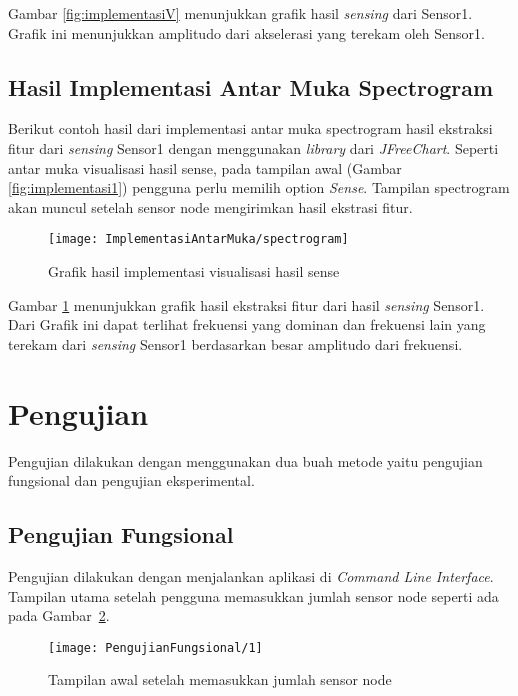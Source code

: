Gambar \ref{fig:implementasiV} menunjukkan grafik hasil {\it sensing} dari Sensor1. Grafik ini menunjukkan amplitudo dari akselerasi yang terekam
oleh Sensor1.

\subsection{Hasil Implementasi Antar Muka Spectrogram}
Berikut contoh hasil dari implementasi antar muka spectrogram hasil ekstraksi fitur dari {\it sensing} Sensor1 dengan menggunakan {\it library} dari {\it JFreeChart}. Seperti antar muka visualisasi hasil sense, pada tampilan awal (Gambar \ref{fig:implementasi1}) pengguna perlu memilih option {\it Sense}. Tampilan spectrogram akan muncul setelah sensor node mengirimkan hasil ekstrasi fitur.

\begin{figure}[H]
	\centering
	\texttt{[image: ImplementasiAntarMuka/spectrogram]}  
	\caption[Grafik hasil implementasi visualisasi hasil sense ]{Grafik hasil implementasi visualisasi hasil sense} 
	\label{fig:implementasiS} 
\end{figure}

Gambar \ref{fig:implementasiS} menunjukkan grafik hasil ekstraksi fitur dari hasil {\it sensing} Sensor1. Dari Grafik ini dapat terlihat frekuensi yang dominan dan frekuensi lain yang terekam dari {\it sensing} Sensor1 berdasarkan besar amplitudo dari frekuensi.

\section{Pengujian}
Pengujian dilakukan dengan menggunakan dua buah metode yaitu pengujian fungsional dan pengujian eksperimental.

\subsection{Pengujian Fungsional}
Pengujian dilakukan dengan menjalankan aplikasi di {\it Command Line Interface}. Tampilan utama setelah pengguna memasukkan jumlah sensor node seperti ada pada 
Gambar~\ref{fig:PengujianFungsional1}.
\begin{figure}[H]
	\centering
	\texttt{[image: PengujianFungsional/1]}  
	\caption[Tampilan awal setelah memasukkan jumlah sensor node ]{Tampilan awal setelah memasukkan jumlah sensor node} 
	\label{fig:PengujianFungsional1} 
\end{figure}


